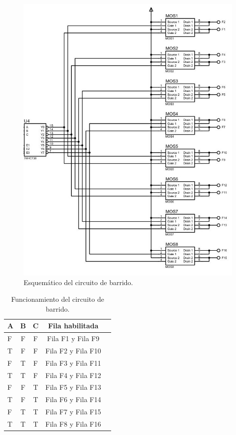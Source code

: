 \begin{figure}[htpb]
	\centering
    \includegraphics[scale=0.6]{Figures/circuitoBarrido.jpg} 
	\caption{Esquemático del circuito de barrido.}
	\label{fig:circuitobarrido}
\end{figure}


\begin{table}[h]
\centering
\caption[Funcionamiento circuito barrido]{Funcionamiento del circuito de barrido.}
\begin{tabular}{l c c c c}
\toprule
\textbf{A}& \textbf{B} & \textbf{C} & \textbf{Fila habilitada}\\
\midrule 


F &F &F &Fila F1 y Fila F9\\
T &F &F &Fila F2 y Fila F10\\
F &T &F &Fila F3 y Fila F11\\
T &T &F &Fila F4 y Fila F12\\
F &F &T &Fila F5 y Fila F13\\
T &F &T &Fila F6 y Fila F14\\
F &T &T &Fila F7 y Fila F15\\
T &T &T &Fila F8 y Fila F16\\


\bottomrule
\hline
\end{tabular}
\label{tab:funcionamientobarrido}
\end{table}


